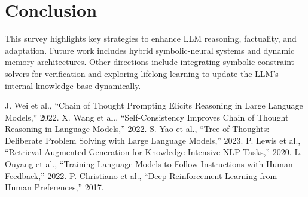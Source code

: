 \documentclass[12pt]{article}
\begin{document}
\section{Conclusion}
This survey highlights key strategies to enhance LLM reasoning, factuality, and adaptation. Future work includes hybrid symbolic-neural systems and dynamic memory architectures. Other directions include integrating symbolic constraint solvers for verification and exploring lifelong learning to update the LLM’s internal knowledge base dynamically.


\begin{thebibliography}{9}
 J. Wei et al., “Chain of Thought Prompting Elicits Reasoning in Large Language Models,” 2022.
 X. Wang et al., “Self-Consistency Improves Chain of Thought Reasoning in Language Models,” 2022.
 S. Yao et al., “Tree of Thoughts: Deliberate Problem Solving with Large Language Models,” 2023.
 P. Lewis et al., “Retrieval-Augmented Generation for Knowledge-Intensive NLP Tasks,” 2020.
 L. Ouyang et al., “Training Language Models to Follow Instructions with Human Feedback,” 2022.
 P. Christiano et al., “Deep Reinforcement Learning from Human Preferences,” 2017.
\end{thebibliography}
\end{document}
